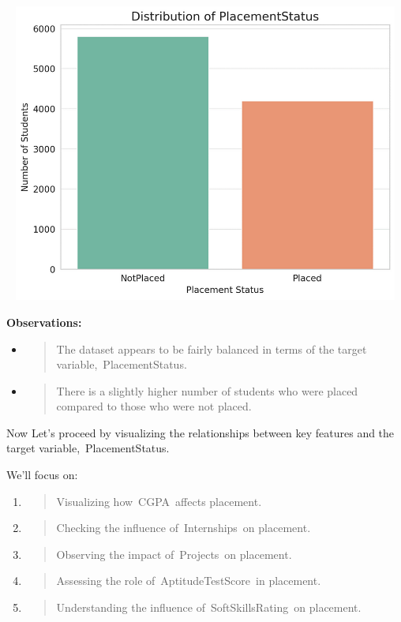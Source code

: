 \documentclass[]{article}
\begin{document}
\includegraphics[width=5.26806in,height=3.87847in]{image3.png}

\textbf{Observations:}

\begin{itemize}
\item
  \begin{quote}
  The dataset appears to be fairly balanced in terms of the target
  variable,~PlacementStatus.
  \end{quote}
\item
  \begin{quote}
  There is a slightly higher number of students who were placed compared
  to those who were not placed.
  \end{quote}
\end{itemize}

Now Let's proceed by visualizing the relationships between key features
and the target variable,~PlacementStatus.

We'll focus on:

\begin{enumerate}
\def\labelenumi{\arabic{enumi}.}
\item
  \begin{quote}
  Visualizing how~CGPA~affects placement.
  \end{quote}
\item
  \begin{quote}
  Checking the influence of~Internships~on placement.
  \end{quote}
\item
  \begin{quote}
  Observing the impact of~Projects~on placement.
  \end{quote}
\item
  \begin{quote}
  Assessing the role of~AptitudeTestScore~in placement.
  \end{quote}
\item
  \begin{quote}
  Understanding the influence of~SoftSkillsRating~on placement.
  \end{quote}
\end{enumerate}
\end{document}
